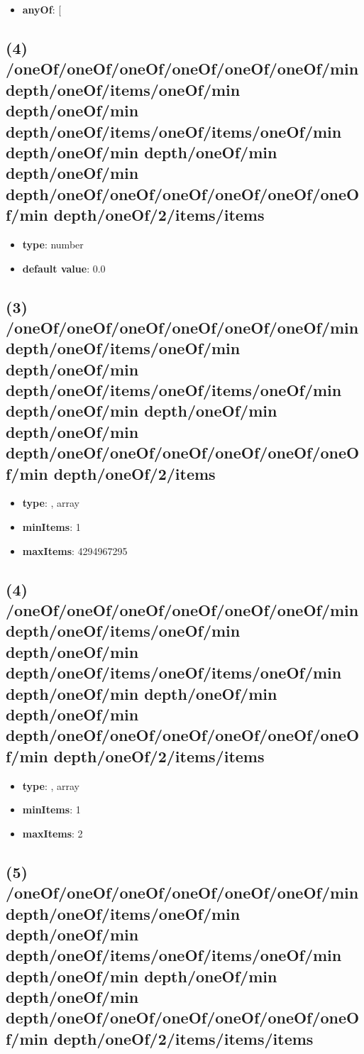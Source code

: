 \begin{itemize}[leftmargin=4em]\item {\bf anyOf}: [\end{itemize}\subsection{(4) /oneOf/oneOf/oneOf/oneOf/oneOf/oneOf/min depth/oneOf/items/oneOf/min depth/oneOf/min depth/oneOf/items/oneOf/items/oneOf/min depth/oneOf/min depth/oneOf/min depth/oneOf/min depth/oneOf/oneOf/oneOf/oneOf/oneOf/oneOf/min depth/oneOf/2/items/items}
\begin{itemize}[leftmargin=4em]\item {\bf type}: number\item {\bf default value}: 0.0
\end{itemize}\subsection{(3) /oneOf/oneOf/oneOf/oneOf/oneOf/oneOf/min depth/oneOf/items/oneOf/min depth/oneOf/min depth/oneOf/items/oneOf/items/oneOf/min depth/oneOf/min depth/oneOf/min depth/oneOf/min depth/oneOf/oneOf/oneOf/oneOf/oneOf/oneOf/min depth/oneOf/2/items}
\begin{itemize}[leftmargin=3em]\item {\bf type}: , array\item {\bf minItems}: 1
\item {\bf maxItems}: 4294967295
\end{itemize}\subsection{(4) /oneOf/oneOf/oneOf/oneOf/oneOf/oneOf/min depth/oneOf/items/oneOf/min depth/oneOf/min depth/oneOf/items/oneOf/items/oneOf/min depth/oneOf/min depth/oneOf/min depth/oneOf/min depth/oneOf/oneOf/oneOf/oneOf/oneOf/oneOf/min depth/oneOf/2/items/items}
\begin{itemize}[leftmargin=4em]\item {\bf type}: , array\item {\bf minItems}: 1
\item {\bf maxItems}: 2
\end{itemize}\subsection{(5) /oneOf/oneOf/oneOf/oneOf/oneOf/oneOf/min depth/oneOf/items/oneOf/min depth/oneOf/min depth/oneOf/items/oneOf/items/oneOf/min depth/oneOf/min depth/oneOf/min depth/oneOf/min depth/oneOf/oneOf/oneOf/oneOf/oneOf/oneOf/min depth/oneOf/2/items/items/items}
